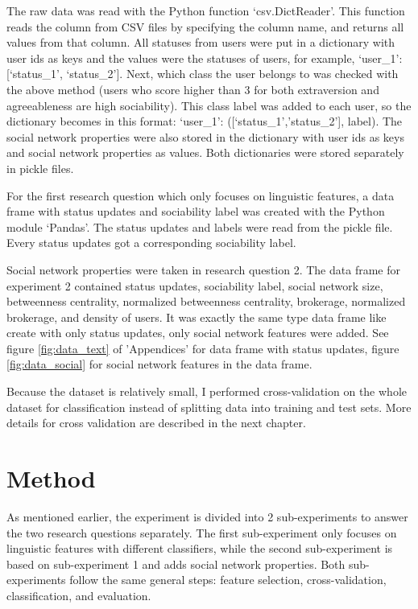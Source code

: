 \documentclass[
10pt, %
a4paper, %
oneside, %
headinclude,footinclude, %
] {book}%
\begin{document}
The raw data was read with the Python function ‘csv.DictReader’. This function reads the column from CSV files by specifying the column name, and returns all values from that column. All statuses from users were put in a dictionary with user ids as keys and the values were the statuses of users, for example, ‘user\_1’: [‘status\_1’, ‘status\_2’].  Next, which class the user belongs to was checked with the above method (users who score higher than 3 for both extraversion and agreeableness are high sociability). This class label was added to each user, so the dictionary becomes in this format: ‘user\_1’: ([‘status\_1’,’status\_2'], label). The social network properties were also stored in the dictionary with user ids as keys and social network properties as values. Both dictionaries were stored separately in pickle files.

For the first research question which only focuses on linguistic features, a data frame with status updates and sociability label was created with the Python module ‘Pandas’. The status updates and labels were read from the pickle file. Every status updates got a corresponding sociability label. 

Social network properties were taken in research question 2. The data frame for experiment 2 contained status updates, sociability label, social network size, betweenness centrality, normalized betweenness centrality, brokerage, normalized brokerage, and density of users. It was exactly the same type data frame like create with only status updates, only social network features were added. See figure \ref{fig:data_text} of 'Appendices' for data frame with status updates, figure \ref{fig:data_social} for social network features in the data frame.

Because the dataset is relatively small, I performed cross-validation on the whole dataset for classification instead of splitting data into training and test sets. More details for cross validation are described in the next chapter.

\chapter{Method}
As mentioned earlier, the experiment is divided into 2 sub-experiments to answer the two research questions separately. The first sub-experiment only focuses on linguistic features with different classifiers, while the second sub-experiment is based on sub-experiment 1 and adds social network properties. Both sub-experiments follow the same general steps: feature selection, cross-validation, classification, and evaluation.
\end{document}

